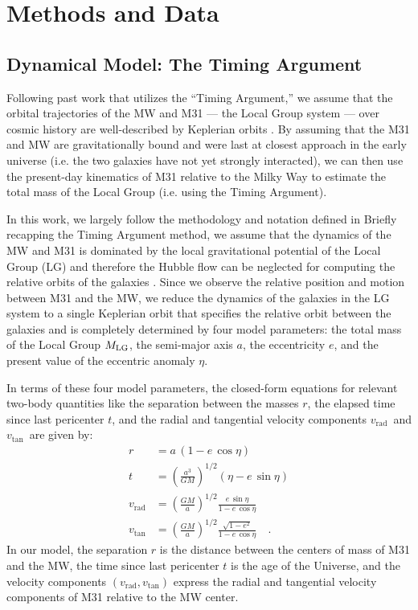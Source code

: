 \documentclass[twocolumn]{aastex631}
\newcommand{\mlg}{\ensuremath{M_{\rm LG}}}
\newcommand{\vtan}{\ensuremath{v_\textrm{tan}}}
\newcommand{\vrad}{\ensuremath{v_\textrm{rad}}}
\begin{document}
\section{Methods and Data}

\subsection{Dynamical Model: The Timing Argument}
\label{sec:timingarg}

Following past work that utilizes the ``Timing Argument,'' we assume that the
orbital trajectories of the MW and M31 --- the Local Group system --- over
cosmic history are well-described by Keplerian orbits \citep[e.g.,][]{Kahn1959,
Kroeker1991, Lynden-Bell:1981, LiWhite2008, vdm2012, Penarrubia2016}.
By assuming that the M31 and MW are gravitationally bound and were last at
closest approach in the early universe (i.e. the two galaxies have not yet
strongly interacted), we can then use the present-day kinematics of M31 relative
to the Milky Way to estimate the total mass of the Local Group (i.e. using the
Timing Argument).

In this work, we largely follow the methodology and notation defined in
\citet{Penarrubia2016}
Briefly recapping the Timing Argument method, we assume that the dynamics of the
MW and M31 is dominated by the local gravitational potential of the Local Group
(LG) and therefore the Hubble flow can be neglected for computing the relative
orbits of the galaxies \citep[see, e.g.,][]{Penarrubia2014}.
Since we observe the relative position and motion between M31 and the MW, we
reduce the dynamics of the galaxies in the LG system to a single Keplerian orbit
that specifies the relative orbit between the galaxies and is completely
determined by four model parameters: the total mass of the Local Group \mlg, the
semi-major axis $a$, the eccentricity $e$, and the present value of the
eccentric anomaly $\eta$.

In terms of these four model parameters, the closed-form equations for relevant
two-body quantities like the separation between the masses $r$, the elapsed time
since last pericenter $t$, and the radial and tangential velocity components
\vrad\ and \vtan\ are given by:
\begin{align}
  r &= a \, (1-e\,\cos\eta) \label{eq:r} \\
  t &= \left( \frac{a^3}{GM} \right)^{1/2}(\eta-e\,\sin\eta) \label{eq:t} \\
  \vrad &= \left( \frac{GM}{a} \right)^{1/2} \frac{e\,\sin\eta}{1-e\,\cos\eta} \label{eq:vrad} \\
  \vtan &= \left( \frac{GM}{a} \right)^{1/2} \frac{\sqrt{1-e^2}}{1-e\,\cos\eta} \label{eq:vtan} \quad .
\end{align}
In our model, the separation $r$ is the distance between the centers of mass of
M31 and the MW, the time since last pericenter $t$ is the age of the Universe,
and the velocity components $(\vrad, \vtan)$ express the radial and tangential
velocity components of M31 relative to the MW center.
\end{document}
